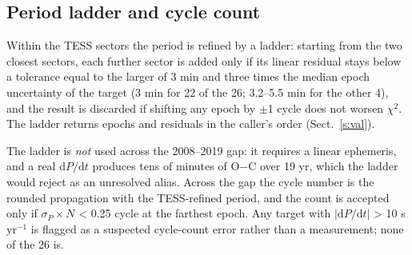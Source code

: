 \documentclass{aa}
\begin{document}
\subsection{Period ladder and cycle count}\label{ss:escada}
Within the TESS sectors the period is refined by a ladder: starting from the two closest sectors, each further sector is added only if its linear residual stays below a tolerance equal to the larger of 3 min and three times the median epoch uncertainty of the target (3 min for 22 of the 26; 3.2--5.5 min for the other 4), and the result is discarded if shifting any epoch by $\pm$1 cycle does not worsen $\chi^2$. The ladder returns epochs and residuals in the caller's order (Sect.~\ref{s:val}).

The ladder is \textit{not} used across the 2008--2019 gap: it requires a linear ephemeris, and a real $\mathrm{d}P/\mathrm{d}t$ produces tens of minutes of O$-$C over 19 yr, which the ladder would reject as an unresolved alias. Across the gap the cycle number is the rounded propagation with the TESS-refined period, and the count is accepted only if $\sigma_P \times N$ < 0.25 cycle at the farthest epoch. Any target with $|\mathrm{d}P/\mathrm{d}t|$ > 10 s\,yr$^{-1}$ is flagged as a suspected cycle-count error rather than a measurement; none of the 26 is.
\end{document}
